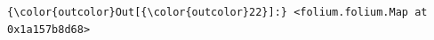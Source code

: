 \documentclass[11pt]{article}
\begin{document}
\begin{Verbatim}[commandchars=\\\{\}]
{\color{outcolor}Out[{\color{outcolor}22}]:} <folium.folium.Map at 0x1a157b8d68>
\end{Verbatim}
            

    
    
    
    
\end{document}
